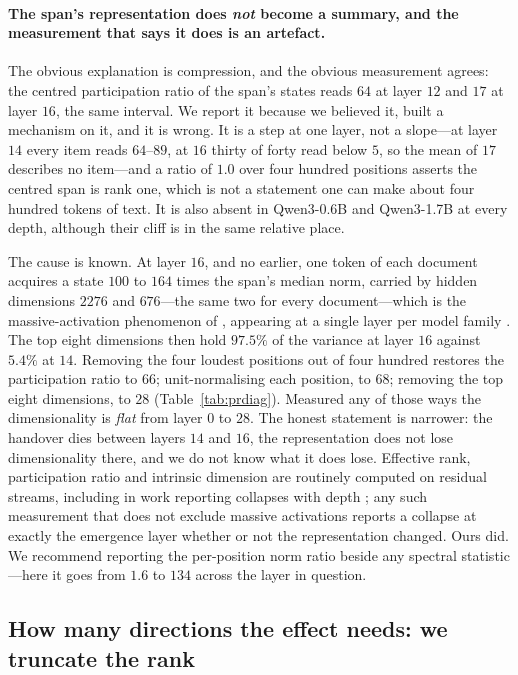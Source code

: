 \documentclass{article}
\begin{document}
\paragraph{The span's representation does \emph{not} become a summary, and the
measurement that says it does is an artefact.} The obvious explanation is
compression, and the obvious measurement agrees: the centred participation ratio
of the span's states reads $64$ at layer $12$ and $17$ at layer $16$, the same
interval. We report it because we believed it, built a mechanism on it, and it
is wrong. It is a step at one layer, not a slope---at layer $14$ every item
reads $64$--$89$, at $16$ thirty of forty read below $5$, so the mean of $17$
describes no item---and a ratio of $1.0$ over four hundred positions asserts the
centred span is rank one, which is not a statement one can make about four
hundred tokens of text. It is also absent in Qwen3-0.6B and Qwen3-1.7B at every
depth, although their cliff is in the same relative place.

The cause is known. At layer $16$, and no earlier, one token of each document
acquires a state $100$ to $164$ times the span's median norm, carried by hidden
dimensions $2276$ and $676$---the same two for every document---which is the
massive-activation phenomenon of \citet{sun2024massive}, appearing at a single
layer per model family \citep{shi2026melayer}. The top eight dimensions then
hold $97.5\%$ of the variance at layer $16$ against $5.4\%$ at $14$. Removing
the four loudest positions out of four hundred restores the participation ratio
to $66$; unit-normalising each position, to $68$; removing the top eight
dimensions, to $28$ (Table~\ref{tab:prdiag}). Measured any of those ways the
dimensionality is \emph{flat} from layer $0$ to $28$. The honest statement is
narrower: the handover dies between layers $14$ and $16$, the representation
does not lose dimensionality there, and we do not know what it does lose.
Effective rank, participation ratio and intrinsic dimension are routinely
computed on residual streams, including in work reporting collapses with depth
\citep{fernando2026residualspectral, sarkar2026causaldim}; any such measurement
that does not exclude massive activations reports a collapse at exactly the
emergence layer whether or not the representation changed. Ours did. We
recommend reporting the per-position norm ratio beside any spectral
statistic---here it goes from $1.6$ to $134$ across the layer in question.

\subsection{How many directions the effect needs: we truncate the rank}
\label{sec:rank}
\end{document}
